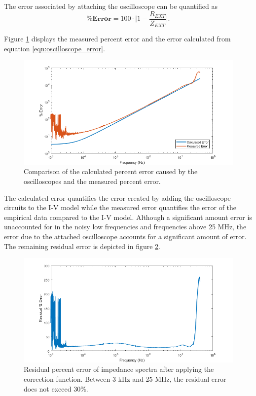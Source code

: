 \par The error associated by attaching the oscilloscope can be quantified as
\begin{equation}
    \pmb{\%} \textbf{Error} = 100 \cdot \bigg| 1 - \frac{R_{EXT}}{Z_{EXT}}\bigg|.
    \label{eqn:oscilloscope_error}
\end{equation}

\par Figure \ref{fig:test_circ_measurement_error} displays the measured percent error and the error calculated from equation \ref{eqn:oscilloscope_error}. 


\begin{figure}[H]{\textwidth}
    \centering
    \includegraphics[width=\textwidth]{images/percentError.png}
    \caption{Comparison of the calculated percent error caused by the oscilloscopes and the measured percent error.}
    \label{fig:test_circ_measurement_error}
\end{figure}

\par The calculated error quantifies the error created by adding the oscilloscope circuits to the I-V model while the measured error quantifies the error of the empirical data compared to the I-V model.  Although a significant amount error is unaccounted for in the noisy low frequencies and frequencies above 25 MHz, the error due to the attached oscilloscope accounts for a significant amount of error.  The remaining residual error is depicted in figure \ref{fig:IS_residual_error}.

\begin{figure}[H]
    \centering
    \includegraphics[width=\textwidth]{images/residualPercentError.png}
    \caption{Residual percent error of impedance spectra after applying the correction function. Between 3 kHz and 25 MHz, the residual error does not exceed 30$\%$.}
    \label{fig:IS_residual_error}
\end{figure}


